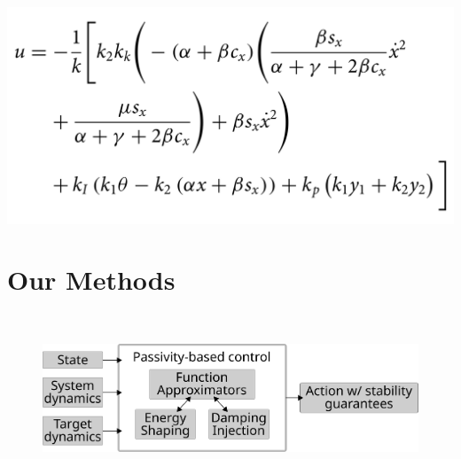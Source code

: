 \documentclass[
]{report}
\begin{document}
\includegraphics[width=8.33333in,height=\textheight]{contents/assets/ballbot_derivation_2.png}

\hypertarget{our-methods}{%
\section{Our Methods}\label{our-methods}}

\begin{figure}

\begin{minipage}[c]{0.10\linewidth}

{\centering 

~

}

\end{minipage}%
%
\begin{minipage}[c]{0.80\linewidth}

{\centering 

\includegraphics{contents/assets/pbc-ml-outline.svg}

}

\end{minipage}%
%
\begin{minipage}[c]{0.10\linewidth}

{\centering 

~

}

\end{minipage}%

\end{figure}
\end{document}
